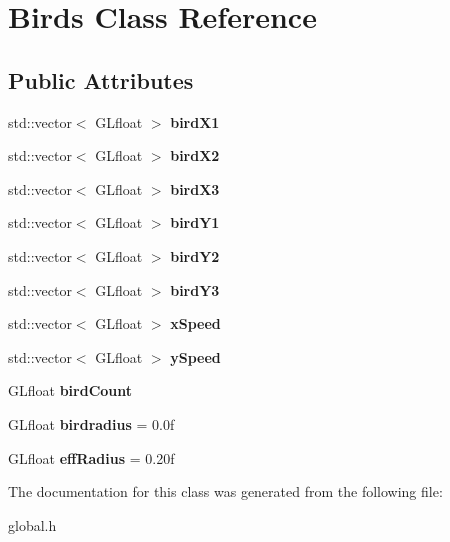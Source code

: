 \hypertarget{class_birds}{}\section{Birds Class Reference}
\label{class_birds}
\subsection*{Public Attributes}
\begin{DoxyCompactItemize}
\item 
\mbox{\label{class_birds_a6ba293f18c7fead68a527100951b955c}} 
std\+::vector$<$ G\+Lfloat $>$ {\bfseries bird\+X1}
\item 
\mbox{\label{class_birds_a954958c85c37e79c4696b46d17035c42}} 
std\+::vector$<$ G\+Lfloat $>$ {\bfseries bird\+X2}
\item 
\mbox{\label{class_birds_a0ba99f8e7f0250bf3c4c9af607a59e6f}} 
std\+::vector$<$ G\+Lfloat $>$ {\bfseries bird\+X3}
\item 
\mbox{\label{class_birds_a575e88ca94ba79186dd4ab2becbccefb}} 
std\+::vector$<$ G\+Lfloat $>$ {\bfseries bird\+Y1}
\item 
\mbox{\label{class_birds_a98bc5dbdba361df1d81ce610a77aa363}} 
std\+::vector$<$ G\+Lfloat $>$ {\bfseries bird\+Y2}
\item 
\mbox{\label{class_birds_adf6c3ba4d13763670bd05ea2875158b8}} 
std\+::vector$<$ G\+Lfloat $>$ {\bfseries bird\+Y3}
\item 
\mbox{\label{class_birds_a224adf6672001d57cf58b3b6ccff1f49}} 
std\+::vector$<$ G\+Lfloat $>$ {\bfseries x\+Speed}
\item 
\mbox{\label{class_birds_a5cbfd0f4e9e0edbc33dcd84a3ee8272f}} 
std\+::vector$<$ G\+Lfloat $>$ {\bfseries y\+Speed}
\item 
\mbox{\label{class_birds_a3d9c19e15da72aac06fb7e4a90f3a29c}} 
G\+Lfloat {\bfseries bird\+Count}
\item 
\mbox{\label{class_birds_ade06c4079c00aa140dc8055a718dfe18}} 
G\+Lfloat {\bfseries birdradius} = 0.\+0f
\item 
\mbox{\label{class_birds_ae19c0d0170a52dbb3944a23dd20800ac}} 
G\+Lfloat {\bfseries eff\+Radius} = 0.\+20f
\end{DoxyCompactItemize}


The documentation for this class was generated from the following file\+:\begin{DoxyCompactItemize}
\item 
global.\+h\end{DoxyCompactItemize}

